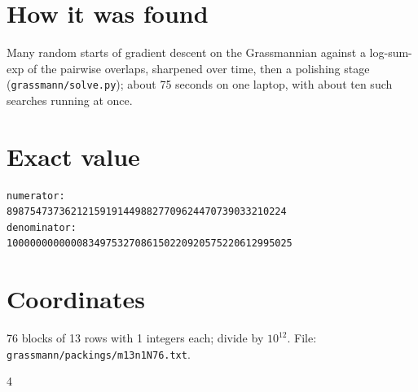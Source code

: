 \documentclass[11pt,a4paper]{article}
\begin{document}
\section{How it was found}
Many random starts of gradient descent on the Grassmannian against a log-sum-exp of the pairwise overlaps, sharpened over time, then a polishing stage (\texttt{grassmann/solve.py}); about 75 seconds on one laptop, with about ten such searches running at once.


\appendix
\section{Exact value}
{\small
\begin{verbatim}
numerator:
898754737362121591914498827709624470739033210224
denominator:
1000000000000834975327086150220920575220612995025
\end{verbatim}}

\section{Coordinates}
76 blocks of 13 rows with 1 integers each; divide by $10^{12}$. File: \texttt{grassmann/packings/m13n1N76.txt}.
{\tiny
\begin{multicols}{4}
\end{multicols}}
\end{document}
